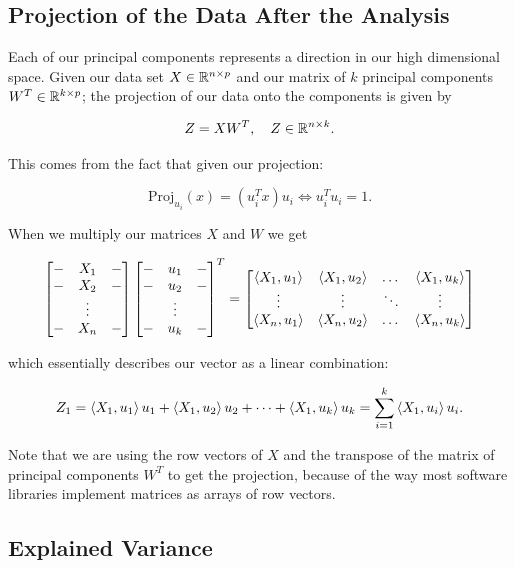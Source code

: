 \subsection{Projection of the Data After the Analysis}

Each of our principal components represents a direction in our high dimensional space. Given our data set \(X \in \mathbb{R}^{n \times p}\)
and our matrix of \(k\) principal components \(W^T \in \mathbb{R}^{k\times p}\); the projection of our data onto the components is given by

\[
	Z = XW^T ,\quad Z \in \mathbb{R}^{n \times k}.
\]

This comes from the fact that given our projection:

\[
	\mathrm{Proj}_{u_i}(x) = (u_i^T x) u_i \iff u_i^T u_i = 1.
\]

When we multiply our matrices \(X\) and \(W\) we get

\[
	\begin{bmatrix}
		- & X_1    & - \\
		- & X_2    & - \\
		  & \vdots &   \\
		- & X_n    & -
	\end{bmatrix}
	\begin{bmatrix}
		- & u_1    & - \\
		- & u_2    & - \\
		  & \vdots &   \\
		- & u_k    & -
	\end{bmatrix}^T
	=
	\begin{bmatrix}
		\left\langle X_1, u_1\right\rangle & \left\langle X_1, u_2\right\rangle & \dots  & \left\langle X_1, u_k\right\rangle \\
		\vdots           & \vdots           & \ddots & \vdots           \\
		\left\langle X_n, u_1\right\rangle & \left\langle X_n, u_2\right\rangle & \dots  & \left\langle X_n, u_k\right\rangle
	\end{bmatrix}
\]

which essentially describes our vector as a linear combination:

\[
	Z_1 = \left\langle X_1, u_1\right\rangle u_1 +  \left\langle X_1, u_2\right\rangle u_2 + \dots + \left\langle X_1, u_k\right\rangle u_k = \sum_{i = 1}^{k} \left\langle X_1, u_i\right\rangle u_i.
\]

Note that we are using the row vectors of \(X\) and the transpose of the matrix of principal components \(W^T\) to get the projection, because of
the way most software libraries implement matrices as arrays of row vectors.

\subsection{Explained Variance}

